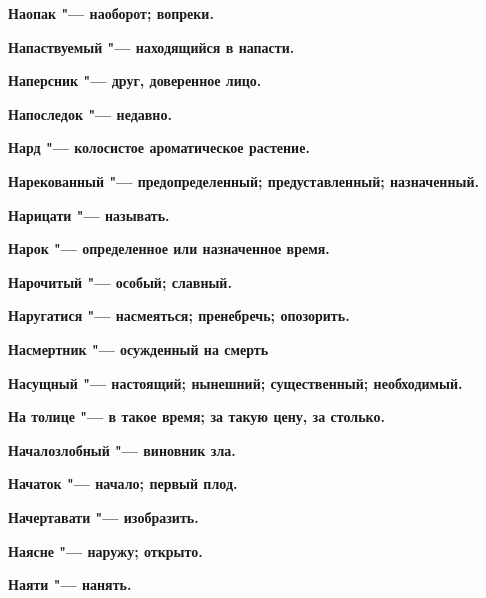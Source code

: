 \begin{mymulticols}{2}
\bfseries Наопак\normalfont{} "--- наоборот; вопреки. 




\bfseries Напаствуемый\normalfont{} "--- находящийся в напасти. 




\bfseries Наперсник\normalfont{} "--- друг, доверенное лицо. 




\bfseries Напоследок\normalfont{} "--- недавно. 




\bfseries Нард\normalfont{} "--- колосистое ароматическое растение. 




\bfseries Нарекованный\normalfont{} "--- предопределенный; предуставленный; назначенный. 




\bfseries Нарицати\normalfont{} "--- называть. 




\bfseries Нарок\normalfont{} "--- определенное или назначенное время. 




\bfseries Нарочитый\normalfont{} "--- особый; славный. 




\bfseries Наругатися\normalfont{} "--- насмеяться; пренебречь; опозорить. 




\bfseries Насмертник\normalfont{} "--- осужденный на смерть 




\bfseries Насущный\normalfont{} "--- настоящий; нынешний; существенный; необходимый. 




\bfseries На толице\normalfont{} "--- в такое время; за такую цену, за столько. 




\bfseries Началозлобный\normalfont{} "--- виновник зла. 




\bfseries Начаток\normalfont{} "--- начало; первый плод. 




\bfseries Начертавати\normalfont{} "--- изобразить. 




\bfseries Наясне\normalfont{} "--- наружу; открыто. 




\bfseries Наяти\normalfont{} "--- нанять. 





\end{mymulticols}
